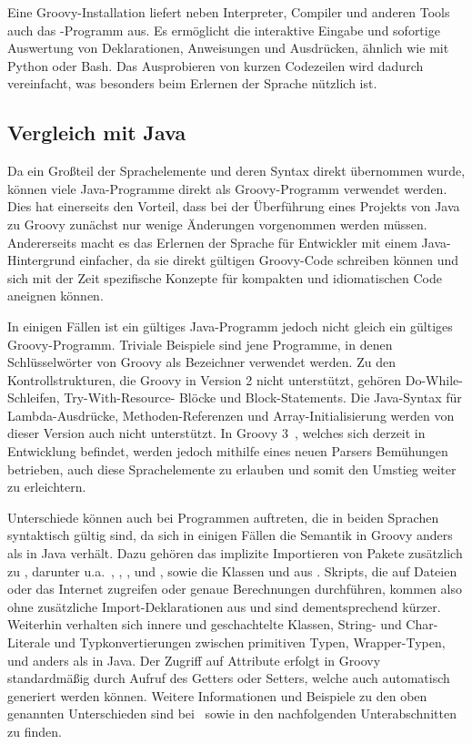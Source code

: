 \documentclass[a4paper]{article}
\begin{document}
Eine Groovy-Installation liefert neben Interpreter, Compiler und anderen Tools auch das -Programm aus.
Es ermöglicht die interaktive Eingabe und sofortige Auswertung von Deklarationen, Anweisungen und Ausdrücken, ähnlich wie mit Python oder Bash.
Das Ausprobieren von kurzen Codezeilen wird dadurch vereinfacht, was besonders beim Erlernen der Sprache nützlich ist.

\subsection{Vergleich mit Java}\label{subsec:vergleichMitJava}

Da ein Großteil der Sprachelemente und deren Syntax direkt übernommen wurde, können viele Java-Programme direkt als Groovy-Programm verwendet werden.
Dies hat einerseits den Vorteil, dass bei der Überführung eines Projekts von Java zu Groovy zunächst nur wenige Änderungen vorgenommen werden müssen.
Andererseits macht es das Erlernen der Sprache für Entwickler mit einem Java-Hintergrund einfacher, da sie direkt gültigen Groovy-Code schreiben können und sich mit der Zeit spezifische Konzepte für kompakten und idiomatischen Code aneignen können.

In einigen Fällen ist ein gültiges Java-Programm jedoch nicht gleich ein gültiges Groovy-Programm.
Triviale Beispiele sind jene Programme, in denen Schlüsselwörter von Groovy als Bezeichner verwendet werden.
Zu den Kontrollstrukturen, die Groovy in Version 2 nicht unterstützt, gehören Do-While-Schleifen, Try-With-Resource- Blöcke und Block-Statements.
Die Java-Syntax für Lambda-Ausdrücke, Methoden-Referenzen und Array-Initialisierung werden von dieser Version auch nicht unterstützt.
In Groovy 3~\cite{groovy-lang:release3}, welches sich derzeit in Entwicklung befindet, werden jedoch mithilfe eines neuen Parsers Bemühungen betrieben, auch diese Sprachelemente zu erlauben und somit den Umstieg weiter zu erleichtern.

Unterschiede können auch bei Programmen auftreten, die in beiden Sprachen syntaktisch gültig sind, da sich in einigen Fällen die Semantik in Groovy anders als in Java verhält.
Dazu gehören das implizite Importieren von Pakete zusätzlich zu , darunter u.a.~, , ,  und , sowie die Klassen  und  aus .
Skripts, die auf Dateien oder das Internet zugreifen oder genaue Berechnungen durchführen, kommen also ohne zusätzliche Import-Deklarationen aus und sind dementsprechend kürzer.
Weiterhin verhalten sich innere und geschachtelte Klassen, String- und Char-Literale und Typkonvertierungen zwischen primitiven Typen, Wrapper-Typen,  und  anders als in Java.
Der Zugriff auf Attribute erfolgt in Groovy standardmäßig durch Aufruf des Getters oder Setters, welche auch automatisch generiert werden können.
Weitere Informationen und Beispiele zu den oben genannten Unterschieden sind bei~\cite[Abs~3.2.]{groovy-lang:documentation} sowie in den nachfolgenden Unterabschnitten zu finden.
\end{document}
